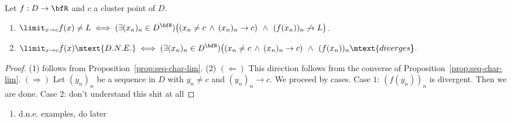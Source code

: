    \begin{theorem}
        Let $f:D \rightarrow \bfR$ and $c$ a cluster point of $D$.
        \begin{enumerate}[label = (\arabic*)]
            \item $\displaystyle \limit_{x \rightarrow c}f(x) \neq L \iff (\exists (x_n)_n \in D^\bfN)\bigl((x_n \neq c \hspace{2pt}\land\hspace{2pt} (x_n)_n \rightarrow c)\hspace{4pt}\land\hspace{4pt} (f(x_n))_n \not\rightarrow L\bigr)$.
            \item $\displaystyle \limit_{x \rightarrow c}f(x) \mtext{D.N.E.} \iff (\exists (x_n)_n \in D^\bfN)\bigl((x_n \neq c \hspace{2pt}\land\hspace{2pt} (x_n)_n \rightarrow c)\hspace{4pt}\land\hspace{4pt} (f(x_n))_n \mtext{diverges}\hspace{-5pt}\bigr)$.
        \end{enumerate}
    \end{theorem}
        \begin{proof}
            (1) follows from Proposition~\ref{prop:seq-char-lim}. (2) $(\Leftarrow)$ This direction follows from the converse of Proposition~\ref{prop:seq-char-lim}. $(\Rightarrow)$ Let $(y_n)_n$ be a sequence in $D$  with $y_n \neq c$ and $(y_n)_n \rightarrow c$. We proceed by cases. Case $1$: $(f(y_n))_n$ is divergent. Then we are done. Case $2$: {\color{red} don't understand this shit at all}
        \end{proof}

    \begin{example}
        \phantom{a}
        \begin{enumerate}[label = (\arabic*)]
            \item {\color{red} d.n.e. examples, do later}
        \end{enumerate}
    \end{example}


